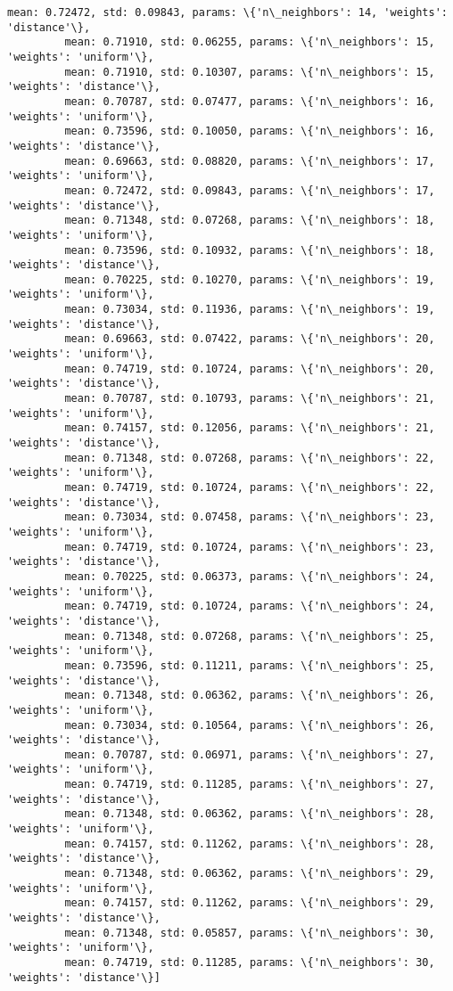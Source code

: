 \documentclass[11pt]{article}
\begin{document}
\begin{Verbatim}[commandchars=\\\{\}]
         mean: 0.72472, std: 0.09843, params: \{'n\_neighbors': 14, 'weights': 'distance'\},
         mean: 0.71910, std: 0.06255, params: \{'n\_neighbors': 15, 'weights': 'uniform'\},
         mean: 0.71910, std: 0.10307, params: \{'n\_neighbors': 15, 'weights': 'distance'\},
         mean: 0.70787, std: 0.07477, params: \{'n\_neighbors': 16, 'weights': 'uniform'\},
         mean: 0.73596, std: 0.10050, params: \{'n\_neighbors': 16, 'weights': 'distance'\},
         mean: 0.69663, std: 0.08820, params: \{'n\_neighbors': 17, 'weights': 'uniform'\},
         mean: 0.72472, std: 0.09843, params: \{'n\_neighbors': 17, 'weights': 'distance'\},
         mean: 0.71348, std: 0.07268, params: \{'n\_neighbors': 18, 'weights': 'uniform'\},
         mean: 0.73596, std: 0.10932, params: \{'n\_neighbors': 18, 'weights': 'distance'\},
         mean: 0.70225, std: 0.10270, params: \{'n\_neighbors': 19, 'weights': 'uniform'\},
         mean: 0.73034, std: 0.11936, params: \{'n\_neighbors': 19, 'weights': 'distance'\},
         mean: 0.69663, std: 0.07422, params: \{'n\_neighbors': 20, 'weights': 'uniform'\},
         mean: 0.74719, std: 0.10724, params: \{'n\_neighbors': 20, 'weights': 'distance'\},
         mean: 0.70787, std: 0.10793, params: \{'n\_neighbors': 21, 'weights': 'uniform'\},
         mean: 0.74157, std: 0.12056, params: \{'n\_neighbors': 21, 'weights': 'distance'\},
         mean: 0.71348, std: 0.07268, params: \{'n\_neighbors': 22, 'weights': 'uniform'\},
         mean: 0.74719, std: 0.10724, params: \{'n\_neighbors': 22, 'weights': 'distance'\},
         mean: 0.73034, std: 0.07458, params: \{'n\_neighbors': 23, 'weights': 'uniform'\},
         mean: 0.74719, std: 0.10724, params: \{'n\_neighbors': 23, 'weights': 'distance'\},
         mean: 0.70225, std: 0.06373, params: \{'n\_neighbors': 24, 'weights': 'uniform'\},
         mean: 0.74719, std: 0.10724, params: \{'n\_neighbors': 24, 'weights': 'distance'\},
         mean: 0.71348, std: 0.07268, params: \{'n\_neighbors': 25, 'weights': 'uniform'\},
         mean: 0.73596, std: 0.11211, params: \{'n\_neighbors': 25, 'weights': 'distance'\},
         mean: 0.71348, std: 0.06362, params: \{'n\_neighbors': 26, 'weights': 'uniform'\},
         mean: 0.73034, std: 0.10564, params: \{'n\_neighbors': 26, 'weights': 'distance'\},
         mean: 0.70787, std: 0.06971, params: \{'n\_neighbors': 27, 'weights': 'uniform'\},
         mean: 0.74719, std: 0.11285, params: \{'n\_neighbors': 27, 'weights': 'distance'\},
         mean: 0.71348, std: 0.06362, params: \{'n\_neighbors': 28, 'weights': 'uniform'\},
         mean: 0.74157, std: 0.11262, params: \{'n\_neighbors': 28, 'weights': 'distance'\},
         mean: 0.71348, std: 0.06362, params: \{'n\_neighbors': 29, 'weights': 'uniform'\},
         mean: 0.74157, std: 0.11262, params: \{'n\_neighbors': 29, 'weights': 'distance'\},
         mean: 0.71348, std: 0.05857, params: \{'n\_neighbors': 30, 'weights': 'uniform'\},
         mean: 0.74719, std: 0.11285, params: \{'n\_neighbors': 30, 'weights': 'distance'\}]
\end{Verbatim}
            
\end{document}
